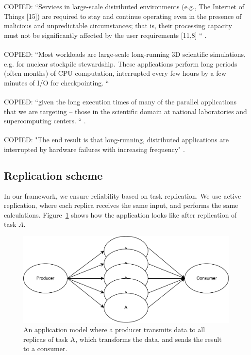 \documentclass{cslthse-msc}
\begin{document}
COPIED:
“Services in large-scale distributed environments (e.g., The Internet of Things [15]) are required to stay and continue operating even in the presence of malicious and unpredictable circumstances; that is, their processing capacity must not be significantly affected by the user requirements [11,8] “ \cite{imprRelAdaptRL}.
\\\\
COPIED: “Most workloads are large-scale long-running 3D scientific simulations, e.g. for nuclear stockpile stewardship. These applications perform long periods (often months) of CPU computation, interrupted every few hours by a few minutes of I/O for checkpointing. “  \cite{studyOfFailures}
\\\\
COPIED: “given the long execution times of many of the parallel applications that we are targeting – those in the scientific domain at national laboratories and supercomputing centers. “  \cite{implicationsOfFailures}. 
\\\\
COPIED: "The end result is that long-running, distributed applications are interrupted by hardware failures with increasing frequency"  \cite{surveyFaultParallel}.

\subsection{Replication scheme}
In our framework, we ensure reliability based on task replication. We use active replication, where each replica receives the same input, and performs the same calculations. Figure~\ref{fig:app_model_replication} shows how the application looks like after replication of task $A$.

\begin{figure}[!hbt]
\centering
\includegraphics[scale=0.5]{images/app_model_replication.pdf} 
\caption{An application model where a producer transmits data to all replicas of task A, which transforms the data, and sends the result to a consumer.}\label{fig:app_model_replication}
\end{figure}
\end{document}
